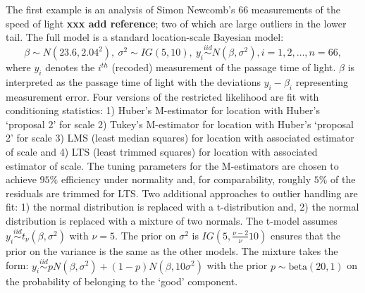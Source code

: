 \documentclass[ba]{imsart}
\newcommand{\iid}{\stackrel{iid}{\sim}}
\begin{document}
The first example is an analysis of Simon Newcomb's 66 measurements of the speed of light {\bf xxx add reference}; two of which are large outliers in the lower tail. The full model is a standard location-scale Bayesian model:
\begin{equation}
\beta\sim N(23.6, 2.04^{2}),\  \sigma^{2}\sim IG(5, 10), \ y_{i}\iid N (\beta, \sigma^{2}), i=1,2,\dots, n=66,
\end{equation}
where $y_{i}$ denotes the $i^{th}$ (recoded) measurement of the passage time of light. $\beta$ is interpreted as the passage time of light with the deviations $y_i - \beta_i$ representing measurement error.
Four versions of the restricted likelihood are fit with conditioning statistics: 1) Huber's M-estimator for location with Huber's `proposal 2'  for scale 2)  Tukey's M-estimator for location with Huber's `proposal 2'  for scale 3) LMS (least median squares) for location with associated estimator of scale and 4) LTS (least trimmed squares)  for location with associated estimator of scale. The tuning parameters for the M-estimators are chosen to achieve $95\%$ efficiency under normality \citep{huber2009} and, for comparability, roughly $5\%$ of the residuals are trimmed for LTS.  Two additional approaches to outlier handling are fit: 1) the normal distribution is replaced with a t-distribution and, 2) the normal distribution is replaced with a mixture of two normals. The t-model assumes $y_{i}\iid t_{\nu} (\beta, \sigma^{2})$ with $\nu=5$. The prior on $\sigma^{2}$ is $IG(5, \frac{\nu-2}{\nu}10)$ ensures that the prior on the variance is the same as the other models. The mixture takes the form: $y_{i}\iid pN (\beta, \sigma^{2}) + (1-p)N(\beta, 10\sigma^{2})$ with the prior $p \sim \text{beta}(20,1)$ on the probability of belonging to the `good' component.  
\end{document}
